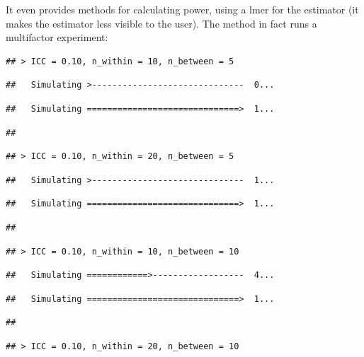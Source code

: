 \documentclass[
]{book}
\begin{document}
It even provides methods for calculating power, using a lmer for the estimator (it makes the estimator less visible to the user).
The method in fact runs a multifactor experiment:

\begin{verbatim}
## > ICC = 0.10, n_within = 10, n_between = 5
\end{verbatim}

\begin{verbatim}
##   Simulating >------------------------------  0...
\end{verbatim}

\begin{verbatim}
##   Simulating ==============================>  1...
\end{verbatim}

\begin{verbatim}
## 
\end{verbatim}

\begin{verbatim}
## > ICC = 0.10, n_within = 20, n_between = 5
\end{verbatim}

\begin{verbatim}
##   Simulating >------------------------------  1...
\end{verbatim}

\begin{verbatim}
##   Simulating ==============================>  1...
\end{verbatim}

\begin{verbatim}
## 
\end{verbatim}

\begin{verbatim}
## > ICC = 0.10, n_within = 10, n_between = 10
\end{verbatim}

\begin{verbatim}
##   Simulating ============>------------------  4...
\end{verbatim}

\begin{verbatim}
##   Simulating ==============================>  1...
\end{verbatim}

\begin{verbatim}
## 
\end{verbatim}

\begin{verbatim}
## > ICC = 0.10, n_within = 20, n_between = 10
\end{verbatim}
\end{document}
